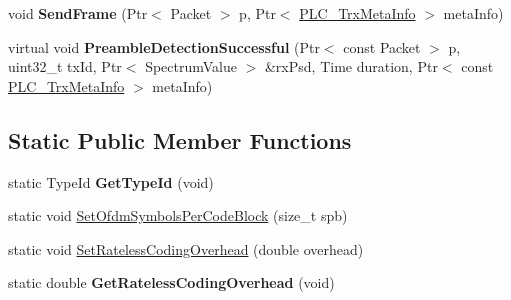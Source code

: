 \begin{DoxyCompactItemize}
\item 
\hypertarget{classns3_1_1PLC__InformationRatePhy_ab06fc75e551a2c4929048fde10d631a2}{void {\bfseries \-Send\-Frame} (\-Ptr$<$ \-Packet $>$ p, \-Ptr$<$ \hyperlink{classns3_1_1PLC__TrxMetaInfo}{\-P\-L\-C\-\_\-\-Trx\-Meta\-Info} $>$ meta\-Info)}\label{classns3_1_1PLC__InformationRatePhy_ab06fc75e551a2c4929048fde10d631a2}

\item 
\hypertarget{classns3_1_1PLC__InformationRatePhy_a1abda27b3a61123aadc4a805fab75292}{virtual void {\bfseries \-Preamble\-Detection\-Successful} (\-Ptr$<$ const \-Packet $>$ p, uint32\-\_\-t tx\-Id, \-Ptr$<$ \-Spectrum\-Value $>$ \&rx\-Psd, \-Time duration, \-Ptr$<$ const \hyperlink{classns3_1_1PLC__TrxMetaInfo}{\-P\-L\-C\-\_\-\-Trx\-Meta\-Info} $>$ meta\-Info)}\label{classns3_1_1PLC__InformationRatePhy_a1abda27b3a61123aadc4a805fab75292}

\end{DoxyCompactItemize}
\subsection*{\-Static \-Public \-Member \-Functions}
\begin{DoxyCompactItemize}
\item 
\hypertarget{classns3_1_1PLC__InformationRatePhy_aa27e24ab2e80873e068ec07fe79ae046}{static \-Type\-Id {\bfseries \-Get\-Type\-Id} (void)}\label{classns3_1_1PLC__InformationRatePhy_aa27e24ab2e80873e068ec07fe79ae046}

\item 
static void \hyperlink{classns3_1_1PLC__InformationRatePhy_a7086fc3196e45abe16d1128bb6ec1453}{\-Set\-Ofdm\-Symbols\-Per\-Code\-Block} (size\-\_\-t spb)
\item 
static void \hyperlink{classns3_1_1PLC__InformationRatePhy_a10a515ea96d92613a7011122cb2f5ea3}{\-Set\-Rateless\-Coding\-Overhead} (double overhead)
\item 
\hypertarget{classns3_1_1PLC__InformationRatePhy_a549d06665933be742b8c614d930659ae}{static double {\bfseries \-Get\-Rateless\-Coding\-Overhead} (void)}\label{classns3_1_1PLC__InformationRatePhy_a549d06665933be742b8c614d930659ae}

\end{DoxyCompactItemize}
